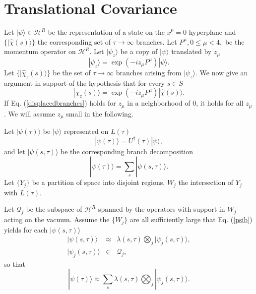 \documentclass[twocolumn,amsmath,amssymb]{revtex4-1}
\begin{document}
\section{\label{sec:transcov} Translational Covariance}

Let $|\psi \rangle  \in \mathcal{H}^R$ be the 
representation of a state on the $x^0 = 0$ hyperplane
and $\{ |\hat{\chi}(s) \rangle  \}$ the corresponding
set of $\tau \rightarrow \infty$ branches.
Let $P^\mu, 0 \le \mu < 4,$ be the momentum operator
on $\mathcal{H}^R$. Let $|\psi_z \rangle $ be a copy
of $|\psi \rangle $ translated by $z_\mu$
\begin{equation}
  \label{psiz}
  |\psi_z \rangle  = \exp( -i  z_\mu P^\mu ) |\psi \rangle .
\end{equation}
Let $\{ |\hat{\chi}_z(s) \rangle  \}$ be the set of 
$\tau \rightarrow \infty$ branches arising
from $|\psi_z \rangle $. We now give
an argument in support of the hypothesis that
for every $s \in S$
\begin{equation}
  \label{displacedbranches}
  |\hat{\chi}_z(s) \rangle  = \exp( -i  z_\mu P^\mu ) |\hat{\chi}(s) \rangle .
\end{equation}
If Eq. (\ref{displacedbranches}) holds for 
$z_\mu$ in a neighborhood of 0, it holds for all $z_\mu$.
We will assume $z_\mu$ small in the following.

Let $|\psi(\tau) \rangle $ be $|\psi \rangle $ represented
on $L(\tau)$
\begin{equation}
  \label{psitau}
  |\psi( \tau) \rangle  =  U^\dagger( \tau) |\psi \rangle ,
\end{equation}
and let $|\psi( s, \tau) \rangle $ be the
corresponding branch decomposition 
\begin{equation}
  \label{branchdecomp}
  |\psi( \tau) \rangle  = \sum_s |\psi( s, \tau) \rangle .
\end{equation}
Let $\{ Y_j \}$ be a partition
of space into disjoint regions, $ W_j$ the
intersection of $Y_j$ with $L(\tau)$.


Let $\mathcal{Q}_j$ be the subspace of $\mathcal{H}^R$
spanned by the operators with support in $W_j$
acting on the vacuum.
Assume the $\{ W_j \}$
are all sufficiently large that Eq. (\ref{psib}) yields
for each $|\psi( s, \tau) \rangle $
\begin{subequations}
\begin{eqnarray}
  \label{psib1}
  |\psi(s, \tau) \rangle  & \approx &
  \lambda(s, \tau) \bigotimes_j |\psi_j(s, \tau) \rangle , \\
  \label{psib2}
  |\psi_j( s, \tau) \rangle  & \in & \mathcal{Q}_j,
\end{eqnarray}
\end{subequations}
so that
\begin{equation}
  \label{branchdecomp1}
  |\psi( \tau) \rangle  \approx \sum_s \lambda(s, \tau) \bigotimes_j |\psi_j(s, \tau) \rangle .
\end{equation}
\end{document}
